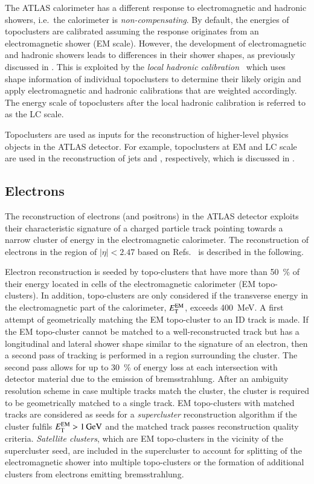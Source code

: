 The ATLAS calorimeter has a different response to electromagnetic and hadronic
showers, i.e.\ the calorimeter is \emph{non-compensating}. By default, the
energies of topoclusters are calibrated assuming the response originates from an
electromagnetic shower (EM scale). However, the development of electromagnetic
and hadronic showers leads to differences in their shower shapes, as previously
discussed in . This is exploited by the \emph{local
  hadronic calibration}~\cite{PERF-2014-07} which uses shape information of
individual topoclusters to determine their likely origin and apply
electromagnetic and hadronic calibrations that are weighted accordingly. The
energy scale of topoclusters after the local hadronic calibration is referred to
as the LC scale.

Topoclusters are used as inputs for the reconstruction of higher-level physics
objects in the ATLAS detector. For example, topoclusters at EM and LC scale are
used in the reconstruction of jets and \tauhadvis, respectively, which is
discussed in .


\subsection{Electrons}%
\label{sec:ele_rec}

The reconstruction of electrons (and positrons) in the ATLAS detector exploits
their characteristic signature of a charged particle track pointing towards a
narrow cluster of energy in the electromagnetic calorimeter. The reconstruction
of electrons in the region of $|\eta| < 2.47$ based on
Refs.~\cite{ATL-PHYS-PUB-2017-022,EGAM-2018-01} is described in the following.

Electron reconstruction is seeded by topo-clusters that have more than
\SI{50}{\percent} of their energy located in cells of the electromagnetic
calorimeter (EM topo-clusters). In addition, topo-clusters are only considered
if the transverse energy in the electromagnetic part of the calorimeter,
$E_{\text{T}}^{\text{EM}}$, exceeds \SI{400}{\MeV}. A first attempt of geometrically
matching the EM topo-cluster to an ID track is made. If the EM topo-cluster
cannot be matched to a well-reconstructed track but has a longitudinal and
lateral shower shape similar to the signature of an electron, then a second pass
of tracking is performed in a region surrounding the cluster. The second pass
allows for up to \SI{30}{\percent} of energy loss at each intersection with
detector material due to the emission of bremsstrahlung. After an ambiguity
resolution scheme in case multiple tracks match the cluster, the cluster is
required to be geometrically matched to a single track. EM topo-clusters with
matched tracks are considered as seeds for a \emph{supercluster} reconstruction
algorithm if the cluster fulfils $E_{\text{T}}^{\text{EM}} > \SI{1}{\ensuremath{\text{GeV}}}$ and the
matched track passes reconstruction quality criteria. \emph{Satellite clusters},
which are EM topo-clusters in the vicinity of the supercluster seed, are
included in the supercluster to account for splitting of the electromagnetic
shower into multiple topo-clusters or the formation of additional clusters from
electrons emitting bremsstrahlung.


